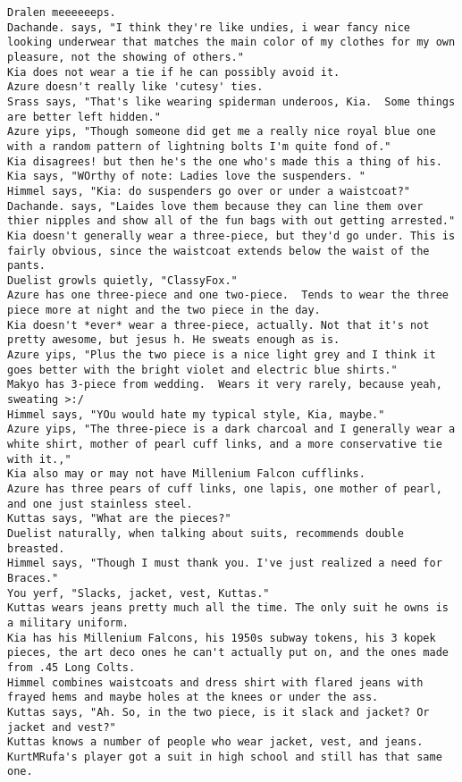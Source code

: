 \begin{verbatim}
Dralen meeeeeeps.
Dachande. says, "I think they're like undies, i wear fancy nice looking underwear that matches the main color of my clothes for my own pleasure, not the showing of others."
Kia does not wear a tie if he can possibly avoid it.
Azure doesn't really like 'cutesy' ties.
Srass says, "That's like wearing spiderman underoos, Kia.  Some things are better left hidden."
Azure yips, "Though someone did get me a really nice royal blue one with a random pattern of lightning bolts I'm quite fond of."
Kia disagrees! but then he's the one who's made this a thing of his.  
Kia says, "WOrthy of note: Ladies love the suspenders. "
Himmel says, "Kia: do suspenders go over or under a waistcoat?"
Dachande. says, "Laides love them because they can line them over thier nipples and show all of the fun bags with out getting arrested."
Kia doesn't generally wear a three-piece, but they'd go under. This is fairly obvious, since the waistcoat extends below the waist of the pants.
Duelist growls quietly, "ClassyFox."
Azure has one three-piece and one two-piece.  Tends to wear the three piece more at night and the two piece in the day.
Kia doesn't *ever* wear a three-piece, actually. Not that it's not pretty awesome, but jesus h. He sweats enough as is.
Azure yips, "Plus the two piece is a nice light grey and I think it goes better with the bright violet and electric blue shirts."
Makyo has 3-piece from wedding.  Wears it very rarely, because yeah, sweating >:/
Himmel says, "YOu would hate my typical style, Kia, maybe."
Azure yips, "The three-piece is a dark charcoal and I generally wear a white shirt, mother of pearl cuff links, and a more conservative tie with it.,"
Kia also may or may not have Millenium Falcon cufflinks.
Azure has three pears of cuff links, one lapis, one mother of pearl, and one just stainless steel.
Kuttas says, "What are the pieces?"
Duelist naturally, when talking about suits, recommends double breasted.
Himmel says, "Though I must thank you. I've just realized a need for Braces."
You yerf, "Slacks, jacket, vest, Kuttas."
Kuttas wears jeans pretty much all the time. The only suit he owns is a military uniform.
Kia has his Millenium Falcons, his 1950s subway tokens, his 3 kopek pieces, the art deco ones he can't actually put on, and the ones made from .45 Long Colts.
Himmel combines waistcoats and dress shirt with flared jeans with frayed hems and maybe holes at the knees or under the ass.
Kuttas says, "Ah. So, in the two piece, is it slack and jacket? Or jacket and vest?"
Kuttas knows a number of people who wear jacket, vest, and jeans.
KurtMRufa's player got a suit in high school and still has that same one.

\end{verbatim}
